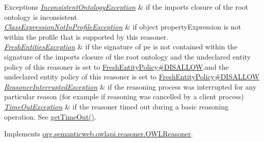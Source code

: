 \begin{DoxyExceptions}{Exceptions}
{\em \hyperlink{classorg_1_1semanticweb_1_1owlapi_1_1reasoner_1_1_inconsistent_ontology_exception}{Inconsistent\-Ontology\-Exception}} & if the imports closure of the root ontology is inconsistent \\
\hline
{\em \hyperlink{classorg_1_1semanticweb_1_1owlapi_1_1reasoner_1_1_class_expression_not_in_profile_exception}{Class\-Expression\-Not\-In\-Profile\-Exception}} & if {\ttfamily object property\-Expression} is not within the profile that is supported by this reasoner. \\
\hline
{\em \hyperlink{classorg_1_1semanticweb_1_1owlapi_1_1reasoner_1_1_fresh_entities_exception}{Fresh\-Entities\-Exception}} & if the signature of {\ttfamily pe} is not contained within the signature of the imports closure of the root ontology and the undeclared entity policy of this reasoner is set to \hyperlink{enumorg_1_1semanticweb_1_1owlapi_1_1reasoner_1_1_fresh_entity_policy_a762eae6d5b2449d125311ecaabfdc8d0}{Fresh\-Entity\-Policy\#\-D\-I\-S\-A\-L\-L\-O\-W}.and the undeclared entity policy of this reasoner is set to \hyperlink{enumorg_1_1semanticweb_1_1owlapi_1_1reasoner_1_1_fresh_entity_policy_a762eae6d5b2449d125311ecaabfdc8d0}{Fresh\-Entity\-Policy\#\-D\-I\-S\-A\-L\-L\-O\-W} \\
\hline
{\em \hyperlink{classorg_1_1semanticweb_1_1owlapi_1_1reasoner_1_1_reasoner_interrupted_exception}{Reasoner\-Interrupted\-Exception}} & if the reasoning process was interrupted for any particular reason (for example if reasoning was cancelled by a client process) \\
\hline
{\em \hyperlink{classorg_1_1semanticweb_1_1owlapi_1_1reasoner_1_1_time_out_exception}{Time\-Out\-Exception}} & if the reasoner timed out during a basic reasoning operation. See \hyperlink{classorg_1_1semanticweb_1_1owlapi_1_1reasoner_1_1impl_1_1_o_w_l_reasoner_base_af55342eaaabb1b72dacfde7a181b93d2}{get\-Time\-Out()}. \\
\hline
\end{DoxyExceptions}


Implements \hyperlink{interfaceorg_1_1semanticweb_1_1owlapi_1_1reasoner_1_1_o_w_l_reasoner_aa9e4507afde2f864c017e417985de2e2}{org.\-semanticweb.\-owlapi.\-reasoner.\-O\-W\-L\-Reasoner}.

